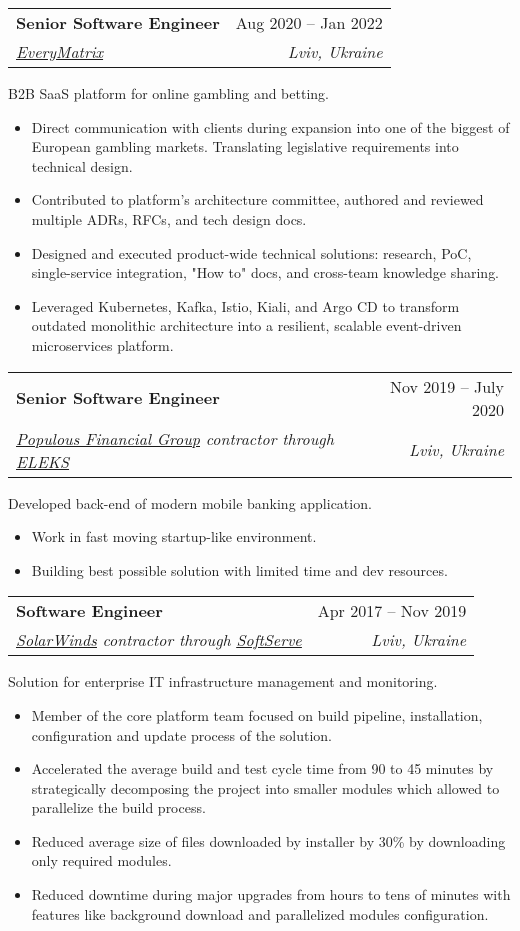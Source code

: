 \documentclass[letterpaper,11pt]{article}
\makeatletter
\newcommand{\resumeItem}[1]{
  \item\small{
    {#1 \vspace{-2pt}}
  }
}
\newcommand{\resumePositionSummary}[1]{
  \item\small{
    {#1 \vspace{-8pt}}
  }
}
\newcommand{\resumeSubheading}[4]{
  \vspace{-2pt}\item
    \begin{tabular*}{0.97\textwidth}[t]{l@{\extracolsep{\fill}}r}
      \textbf{#1} & #2 \\
      \textit{\small#3} & \textit{\small #4} \\
    \end{tabular*}\vspace{-7pt}
}
\newcommand{\resumeSubSubheading}[2]{
    \item
    \begin{tabular*}{0.97\textwidth}{l@{\extracolsep{\fill}}r}
      \textit{\small#1} & \textit{\small #2} \\
    \end{tabular*}\vspace{-7pt}
}
\newcommand{\resumeSubHeadingListEnd}{\end{itemize}}
\newcommand{\resumeItemListStart}{\begin{itemize}}
\newcommand{\resumeItemListEnd}{\end{itemize}\vspace{-5pt}}
\makeatother
\begin{document}

    \resumeSubheading
      {Senior Software Engineer}{Aug 2020 --  Jan 2022}
      {\href{https://everymatrix.com/}{\underline{EveryMatrix}}}{Lviv, Ukraine}

      \resumePositionSummary{B2B SaaS platform for online gambling and betting.}

      \resumeItemListStart
        \resumeItem{Direct communication with clients during expansion into one of the biggest of European gambling markets. Translating legislative requirements into technical design.}
        \resumeItem{Contributed to platform's architecture committee, authored and reviewed multiple ADRs, RFCs, and tech design docs.}
        \resumeItem{Designed and executed product-wide technical solutions: research, PoC, single-service integration, "How to" docs, and cross-team knowledge sharing.}
        \resumeItem{Leveraged Kubernetes, Kafka, Istio, Kiali, and Argo CD to transform outdated monolithic architecture into a resilient, scalable event-driven microservices platform.}
      \resumeItemListEnd

    \resumeSubheading
      {Senior Software Engineer}{Nov 2019 -- July 2020}
      {\href{https://www.populusfinancial.com/}{\underline{Populous Financial Group}} contractor through \href{https://eleks.com/}{\underline{ELEKS}}}{Lviv, Ukraine}
      \resumePositionSummary{Developed back-end of modern mobile banking application.}
      \resumeItemListStart
        \resumeItem{Work in fast moving startup-like environment.}
        \resumeItem{Building best possible solution with limited time and dev resources.}
      \resumeItemListEnd

      \resumeSubheading
      {Software Engineer}{Apr 2017 -- Nov 2019}
      {\href{https://www.solarwinds.com/}{\underline{SolarWinds}} contractor through \href{https://www.softserveinc.com/en-us}{\underline{SoftServe}}}{Lviv, Ukraine}
      \resumePositionSummary{Solution for enterprise IT infrastructure management and monitoring.}
      
      \resumeItemListStart
        \resumeItem{Member of the core platform team focused on build pipeline, installation, configuration and update process of the solution.}
        \resumeItem{Accelerated the average build and test cycle time from 90 to 45 minutes by strategically decomposing the project into smaller modules which allowed to parallelize the build process.}
        \resumeItem{Reduced average size of files downloaded by installer by 30\% by downloading only required modules.}
        \resumeItem{Reduced downtime during major upgrades from hours to tens of minutes with features like background download and parallelized modules configuration.}
      \resumeItemListEnd
\end{document}
